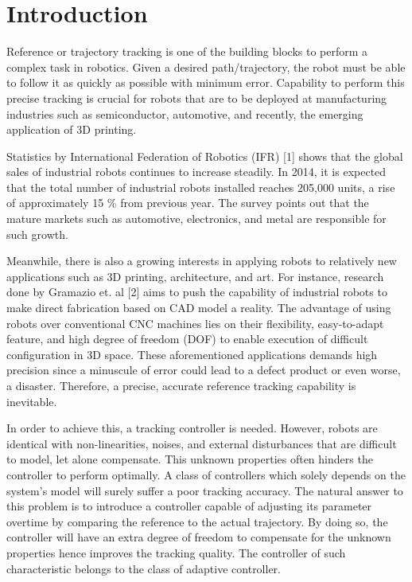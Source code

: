 %
\chapter{Introduction} \label{chap::intro}
Reference or trajectory tracking is one of the building blocks to perform a complex task in robotics. Given a desired path/trajectory, the robot must be able to follow it as quickly as possible with minimum error. Capability to perform this precise tracking is crucial for robots that are to be deployed at manufacturing industries such as semiconductor, automotive, and recently, the emerging application of 3D printing. 

Statistics by International Federation of Robotics (IFR) [1] shows that the global sales of industrial robots continues to increase steadily. In 2014, it is expected that the total number of industrial robots installed reaches 205,000 units, a rise of approximately 15 \% from previous year. The survey points out that the mature markets such as automotive, electronics, and metal are responsible for such growth. 

Meanwhile, there is also a growing interests in applying robots to relatively new applications such as 3D printing, architecture, and art. For instance, research done by Gramazio et. al [2] aims to push the capability of industrial robots to make direct fabrication based on CAD model a reality. The advantage of using robots over conventional CNC machines lies on their flexibility, easy-to-adapt feature, and high degree of freedom (DOF) to enable execution of difficult configuration in 3D space. These aforementioned applications demands high precision since a minuscule of error could lead to a defect product or even worse, a disaster. Therefore, a precise, accurate reference tracking capability is inevitable.

In order to achieve this, a tracking controller is needed. However, robots are identical with non-linearities, noises, and external disturbances that are difficult to model, let alone compensate. This unknown properties often hinders the controller to perform optimally. A class of controllers which solely depends on the system's model will surely suffer a poor tracking accuracy. The natural answer to this problem is to introduce a controller capable of adjusting its parameter overtime by comparing the reference to the actual trajectory. By doing so, the controller will have an extra degree of freedom to compensate for the unknown properties hence improves the tracking quality. The controller of such characteristic belongs to the class of adaptive controller.

